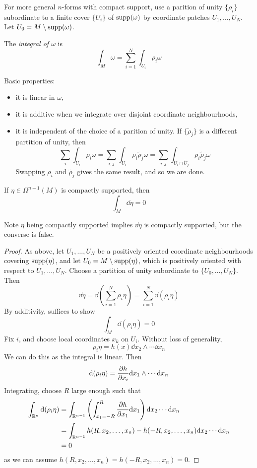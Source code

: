 \documentclass{article}
\begin{document}
For more general \(n\)-forms with compact support, use a parition of unity \(\{\rho_i\}\) subordinate to a finite cover \(\{U_i\}\) of \(\operatorname{supp}(\omega)\) by coordinate patches \(U_1, \dots, U_N\). Let \(U_0 = M \setminus \operatorname{supp}(\omega)\).
\begin{definition}
    The \emph{integral of \(\omega\)} is
    \[\int_M \omega = \sum_{i=1}^N \int_{U_i}\rho_i\omega\]
\end{definition}
Basic properties:
\begin{itemize}
    \item it is linear in \(\omega\),
    \item it is additive when we integrate over disjoint coordinate neighbourhoods,
    \item it is independent of the choice of a parition of unity. If \(\{\tilde\rho_j\}\) is a different partition of unity, then
    \[\sum_i \int_{U_i} \rho_i\omega = \sum_{i, j}\int_{U_i} \rho_i\tilde\rho_j\omega = \sum_{i, j}\int_{U_i \cap \tilde U_j}\rho_i\tilde\rho_j \omega\]
    Swapping \(\rho_i\) and \(\tilde\rho_j\) gives the same result, and so we are done.
\end{itemize}

\begin{theorem}
     If \(\eta \in \Omega^{n-1}(M)\) is compactly supported, then
    \[\int_M \dd \eta = 0\]
\end{theorem}

Note \(\eta\) being compactly supported implies \(\dd\eta\) is compactly supported, but the converse is false.

\begin{proof}
    As above, let \(U_1, \dots, U_N\) be a positively oriented coordinate neighbourhoods covering \(\operatorname{supp}(\eta)\), and let \(U_0 = M \setminus \operatorname{supp}(\eta)\), which is positively oriented with respect to \(U_1, \dots, U_N\). Choose a partition of unity subordinate to \(\{U_0, \dots, U_N\}\). Then
    \[\dd \eta = \dd\left(\sum_{i=1}^N \rho_i\eta\right) = \sum_{i=1}^N \dd(\rho_i\eta)\]
    By additivity, suffices to show
    \[\int_M \dd(\rho_i\eta) = 0\]
    Fix \(i\), and choose local coordinates \(x_k\) on \(U_i\). Without loss of generality,
    \[\rho_i\eta = h(x) \dd x_2 \wedge \cdots \dd x_n\]
    We can do this as the integral is linear. Then
    \[\dd(\rho_i\eta) = \pdv{h}{x_i}\dd x_1 \wedge \cdots \dd x_n\]
    Integrating, choose \(R\) large enough such that
    \begin{align*}
        \int_{\mathbb{R}^n}\dd(\rho_i\eta) &= \int_{\mathbb{R}^{n-1}}\left(\int_{x_1=-R}^R\pdv{h}{x_1}\dd x_1\right)\dd x_2 \cdots \dd x_n \\
        &= \int_{\mathbb{R}^{n-1}}h(R, x_2, \dots, x_n) - h(-R, x_2, \dots, x_n)\dd x_2\cdots \dd x_n \\
        &= 0
    \end{align*}
    as we can assume \(h(R, x_2, \dots, x_n) = h(-R, x_2, \dots, x_n) = 0\).
\end{proof}
\end{document}
